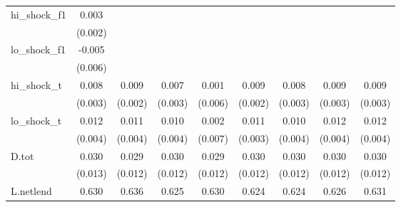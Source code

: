 {\begin{tabular}{l*{8}{c}}
\addlinespace
hi\_shock\_f1 &       0.003         &                     &                     &                     &                     &                     &                     &                     \\
            &     (0.002)         &                     &                     &                     &                     &                     &                     &                     \\
\addlinespace
lo\_shock\_f1 &      -0.005         &                     &                     &                     &                     &                     &                     &                     \\
            &     (0.006)         &                     &                     &                     &                     &                     &                     &                     \\
\addlinespace
hi\_shock\_t  &       0.008\sym{***}&       0.009\sym{***}&       0.007\sym{**} &       0.001         &       0.009\sym{***}&       0.008\sym{**} &       0.009\sym{***}&       0.009\sym{***}\\
            &     (0.003)         &     (0.002)         &     (0.003)         &     (0.006)         &     (0.002)         &     (0.003)         &     (0.003)         &     (0.003)         \\
\addlinespace
lo\_shock\_t  &       0.012\sym{***}&       0.011\sym{***}&       0.010\sym{**} &       0.002         &       0.011\sym{***}&       0.010\sym{**} &       0.012\sym{***}&       0.012\sym{***}\\
            &     (0.004)         &     (0.004)         &     (0.004)         &     (0.007)         &     (0.003)         &     (0.004)         &     (0.004)         &     (0.004)         \\
\addlinespace
D.tot       &       0.030\sym{**} &       0.029\sym{**} &       0.030\sym{**} &       0.029\sym{**} &       0.030\sym{**} &       0.030\sym{**} &       0.030\sym{**} &       0.030\sym{**} \\
            &     (0.013)         &     (0.012)         &     (0.012)         &     (0.012)         &     (0.012)         &     (0.012)         &     (0.012)         &     (0.012)         \\
\addlinespace
L.netlend   &       0.630\sym{***}&       0.636\sym{***}&       0.625\sym{***}&       0.630\sym{***}&       0.624\sym{***}&       0.624\sym{***}&       0.626\sym{***}&       0.631\sym{***}\\

\end{tabular}}
